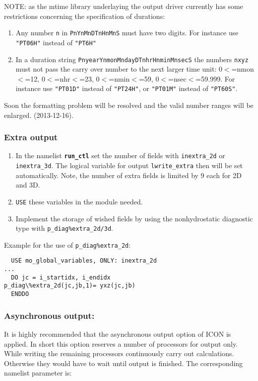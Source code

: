 \color{red}NOTE: as the mtime library underlaying the output driver
  currently has some restrictions concerning the specification of durations:\begin{enumerate}
\item Any number \texttt{n} in \texttt{PnYnMnDTnHnMnS} must have two digits. For instance use \texttt{"PT06H"} instead of \texttt{"PT6H"}
\item In a duration string \texttt{PnyearYnmonMndayDTnhrHnminMnsecS} the numbers \texttt{nxyz} must not pass the carry over number to the next larger time unit: 0$<$=nmon$<$=12, 0$<$=nhr$<$=23, 0$<$=nmin$<$=59, 0$<$=nsec$<$=59.999. For instance use \texttt{"PT01D"} instead of \texttt{"PT24H"}, or \texttt{"PT01M"} instead of \texttt{"PT60S"}.
\end{enumerate}

Soon the formatting problem will be resolved and the valid number ranges will be enlarged.
(2013-12-16).\color{black}



\subsubsection{Extra output}


\begin{enumerate} 
\item In the namelist {\bf \texttt{run\_ctl}} set the number of fields with \texttt{inextra\_2d} or
  \texttt{inextra\_3d}. The logical variable for output
  \texttt{lwrite\_extra} then will be set automatically. Note, the
  number of extra fields is limited by $9$ each for 2D and 3D.
\item  \texttt{USE} these variables in the module needed.
\item Implement the storage of wished fields by using the
  nonhydrostatic diagnostic type with
  \texttt{p\_diag\%extra\_2d/3d}. 
\end{enumerate} 

Example for the use of  \texttt{p\_diag\%extra\_2d}:  

\begin{small}
\begin{verbatim}
  USE mo_global_variables, ONLY: inextra_2d
...
  DO jc = i_startidx, i_endidx
p_diag\%extra_2d(jc,jb,1)= yxz(jc,jb)
  ENDDO
\end{verbatim}
\end{small}


\subsubsection*{Asynchronous output:}
It is highly recommended that the asynchronous output option of ICON is applied. In short
this option reserves a number of processors for output only. While writing the remaining
processors continuously carry out calculations. Otherwise they would have to wait until
output is finished. The corresponding namelist parameter is:

